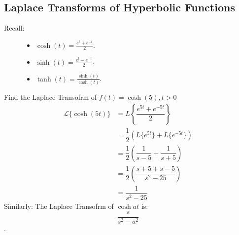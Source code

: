 \documentclass[a4paper]{extarticle}
\theoremstyle{definition}
\theoremstyle{plain}
\begin{document}
\subsection{Laplace Transforms of Hyperbolic Functions}
Recall:
\begin{figure}[htbp]
  \centering
  \begin{minipage}[c]{0.45\textwidth}
  \end{minipage}%
  \hfill
  \begin{minipage}[c]{0.45\textwidth}
    \begin{itemize}
      \item \( \cosh(t) = \frac{e^t + e^{-t}}{2} \).
      \item \( \sinh(t) = \frac{e^t - e^{-t}}{2} \).
      \item \( \tanh(t) = \frac{\sinh(t)}{\cosh(t)} \).
    \end{itemize}
  \end{minipage}
\end{figure}

\begin{examplebox}[Example]
  Find the Laplace Transofrm of $f(t) = \cosh(5),  t > 0$
  \begin{align*}
    \mathcal{L}\{\cosh(5t)\} & = L\left\{\dfrac{e^{5t} + e^{-5t}}{2}\right\}               \\
                             & = \dfrac{1}{2} \left(L\{e^{5t}\} + L\{e^{-5t}\}\right)      \\
                             & = \dfrac{1}{2} \left(\dfrac{1}{s-5} + \dfrac{1}{s+5}\right) \\
                             & = \dfrac{1}{2} \left(\dfrac{s+5 + s-5}{s^2 - 25}\right)     \\
                             & = \dfrac{1}{s^2 - 25}
  \end{align*}
  \noindent Similarly: The Laplace Transofrm of $\cosh{at}$ is: $$\dfrac{s}{s^2 - a^2}$$.
\end{examplebox}
\end{document}
